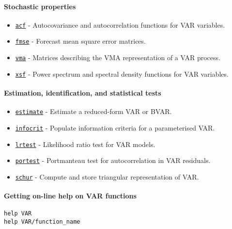 \paragraph{Stochastic properties}

\begin{itemize}
\itemsep1pt\parskip0pt
\item
  \href{VAR/acf}{\texttt{acf}} - Autocovariance and autocorrelation
  functions for VAR variables.
\item
  \href{VAR/fmse}{\texttt{fmse}} - Forecast mean square error matrices.
\item
  \href{VAR/vma}{\texttt{vma}} - Matrices describing the VMA
  representation of a VAR process.
\item
  \href{VAR/xsf}{\texttt{xsf}} - Power spectrum and spectral density
  functions for VAR variables.
\end{itemize}

\paragraph{Estimation, identification, and statistical
tests}

\begin{itemize}
\itemsep1pt\parskip0pt
\item
  \href{VAR/estimate}{\texttt{estimate}} - Estimate a reduced-form VAR
  or BVAR.
\item
  \href{VAR/infocrit}{\texttt{infocrit}} - Populate information criteria
  for a parameterised VAR.
\item
  \href{VAR/lrtest}{\texttt{lrtest}} - Likelihood ratio test for VAR
  models.
\item
  \href{VAR/portest}{\texttt{portest}} - Portmanteau test for
  autocorrelation in VAR residuals.
\item
  \href{VAR/schur}{\texttt{schur}} - Compute and store triangular
  representation of VAR.
\end{itemize}

\paragraph{Getting on-line help on VAR
functions}

\begin{verbatim}
help VAR
help VAR/function_name
\end{verbatim}



